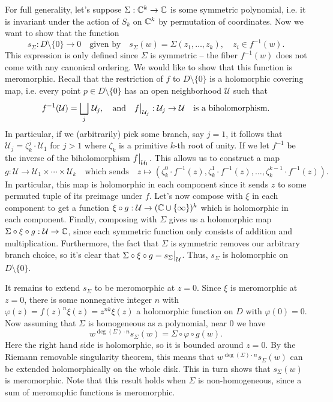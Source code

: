 \documentclass{lkx_pset}
\begin{document}
\begin{solution}
	For full generality, let's suppose $\Sigma : \mathbb{C}^k \to \mathbb{C}$ is some symmetric polynomial, i.e. it is invariant under the action of $S_k$ on $\mathbb{C}^k$ by permutation of coordinates. Now we want to show that the function
	\[
		s_\Sigma : D\setminus \{0\} \to 0\quad\textrm{given by}\quad s_\Sigma(w) = \Sigma(z_1,\ldots, z_k), \quad z_i\in f^{-1}(w).
	\]
	This expression is only defined since $\Sigma$ is symmetric -- the fiber $f^{-1}(w)$ does not come with any canonical ordering. We would like to show that this function is meromorphic. Recall that the restriction of $f$ to $D\setminus \{0\}$ is a holomorphic covering map, i.e. every point $p\in D\setminus \{0\}$ has an open neighborhood $\mathcal{U}$ such that
	\[
		f^{-1}(\mathcal{U}) = \bigsqcup_{j}\, \mathcal{U}_j, \quad \textrm{and}\quad \restr{f}{\mathcal{U}_j} : \mathcal{U}_j \to \mathcal{U}\quad\textrm{is a biholomorphism.}
	\]
	In particular, if we (arbitrarily) pick some branch, say $j=1$, it follows that $\mathcal{U}_j = \zeta^j_k\cdot \mathcal{U}_1$ for $j>1$ where $\zeta_k$ is a primitive $k$-th root of unity. If we let $f^{-1}$ be the inverse of the biholomorphism $\restr{f}{\mathcal{U}_1}$. This allows us to construct a map
	\[
		g : \mathcal{U} \to \mathcal{U}_1\times\cdots\times\mathcal{U}_k\quad\textrm{which sends}\quad z \mapsto (\zeta_k^0\cdot f^{-1}(z), \zeta_k^1\cdot f^{-1}(z), \ldots, \zeta_k^{k-1}\cdot f^{-1}(z)).
	\]
	In particular, this map is holomorphic in each component since it sends $z$ to some permuted tuple of its preimage under $f$. Let's now compose with $\xi$ in each component to get a function $\xi\circ g : \mathcal{U}\to (\mathbb{C}\cup\{\infty\})^k$ which is holomorphic in each component. Finally, composing with $\Sigma$ gives us a holomorphic map $\Sigma \circ\xi\circ g : \mathcal{U} \to \mathbb{C}$, since each symmetric function only consists of addition and multiplication.
	Furthermore, the fact that $\Sigma$ is symmetric removes our arbitrary branch choice, so it's clear that $\Sigma \circ \xi \circ g = \restr{s_\Sigma}{\mathcal{U}}$. Thus, $s_\Sigma$ is holomorphic on $D\setminus \{0\}$.

	It remains to extend $s_\Sigma$ to be meromorphic at $z=0$. Since $\xi$ is meromorphic at $z=0$, there is some nonnegative integer $n$ with $\varphi(z) = f(z)^n\xi(z)=z^{nk}\xi(z)$ a holomorphic function on $D$ with $\varphi(0)=0$. Now assuming that $\Sigma$ is homogeneous as a polynomial, near $0$ we have
	\[
		w^{\deg(\Sigma)\cdot n} s_\Sigma(w) = \Sigma\circ \varphi\circ g(w).
	\]
	Here the right hand side is holomorphic, so it is bounded around $z=0$. By the Riemann removable singularity theorem, this means that $w^{\deg(\Sigma)\cdot n}s_\Sigma(w)$ can be extended holomorphically on the whole disk. This in turn shows that $s_\Sigma(w)$ is meromorphic. Note that this result holds when $\Sigma$ is non-homogeneous, since a sum of meromophic functions is meromorphic.
\end{solution}
\end{document}
